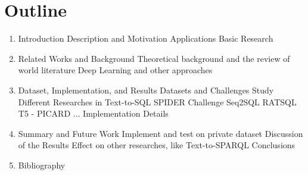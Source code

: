 
\section{Outline}

\begin{enumerate}

\item Introduction
\subitem Description and Motivation
\subitem Applications
\subitem Basic Research
\item Related Works and Background
\subitem Theoretical background and the review of world literature
\subitem Deep Learning and other approaches
\item Dataset, Implementation, and Results
\subitem Datasets and Challenges
\subitem Study Different Researches in Text-to-SQL SPIDER Challenge
\subsubitem Seq2SQL
\subsubitem RATSQL
\subsubitem T5 - PICARD
\subsubitem ...
\subitem Implementation Details
\item Summary and Future Work
\subitem Implement and test on private dataset
\subitem Discussion of the Results
\subitem Effect on other researches, like Text-to-SPARQL
\subitem Conclusions
\item Bibliography

\end{enumerate}

